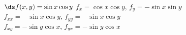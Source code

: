 {$\ds f(x,y) = \sin x\cos y$
}
{$f_x=\cos x\cos y$, $f_y=-\sin x\sin y$\\
$f_{xx}=-\sin x\cos y$, $f_{yy}=-\sin x\cos y$\\
$f_{xy}=-\sin y\cos x$, $f_{yx}=-\sin y\cos x$\\
}